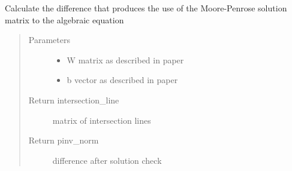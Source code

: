 \documentclass[letterpaper,10pt,english]{sphinxmanual}
\begin{document}

\begin{fulllineitems}
\label{\detokenize{functions:functions.mooore_penrose_solution}}
Calculate the difference that produces the use of the Moore-Penrose solution matrix to the algebraic equation
\begin{quote}\begin{description}
\item[{Parameters}] \leavevmode\begin{itemize}
\item {} 
 \textendash{} W matrix as described in paper

\item {} 
 \textendash{} b vector as described in paper

\end{itemize}

\item[{Return intersection\_line}] \leavevmode
matrix of intersection lines

\item[{Return pinv\_norm}] \leavevmode
difference after solution check

\end{description}\end{quote}

\end{fulllineitems}

\end{document}
